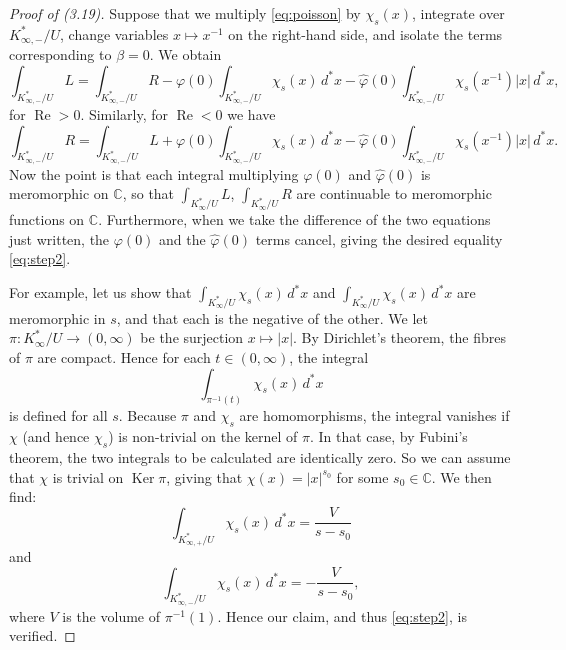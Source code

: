 \documentclass[12pt,a4paper]{article}
\theoremstyle{plain}
\theoremstyle{definition}
\DeclareMathOperator{\Res}{Re}
\DeclareMathOperator{\Ker}{Ker}
\newcommand{\C}{\mathbb{C}}
\begin{document}
\begin{proof}[Proof of (3.19)]
Suppose that we multiply \eqref{eq:poisson} by $\chi_s(x)$, integrate over $K_{\infty,-}^*/U$, change variables $x\mapsto x^{-1}$ on the right-hand side, and isolate the terms corresponding to $\beta=0$. We obtain
\[
\int_{K_{\infty,-}^*/U}L=\int_{K_{\infty,-}^*/U}R-\varphi(0)\int_{K_{\infty,-}^*/U}\chi_s(x)\,d^*x-\hat{\varphi}(0)\int_{K_{\infty,-}^*/U}\chi_s(x^{-1})|x|\,d^*x,
\]
for $\Res>0$. Similarly, for $\Res<0$ we have
\[
\int_{K_{\infty,-}^*/U}R=\int_{K_{\infty,-}^*/U}L+\varphi(0)\int_{K_{\infty,-}^*/U}\chi_s(x)\,d^*x-\hat{\varphi}(0)\int_{K_{\infty,-}^*/U}\chi_s(x^{-1})|x|\,d^*x.
\]
Now the point is that each integral multiplying $\varphi(0)$ and $\hat{\varphi}(0)$ is meromorphic on $\C$, so that $\int_{K_{\infty}^*/U}L$, $\int_{K_{\infty}^*/U}R$ are continuable to meromorphic functions on $\C$. Furthermore, when we take the difference of the two equations just written, the $\varphi(0)$ and the $\hat{\varphi}(0)$ terms cancel, giving the desired equality \eqref{eq:step2}.

For example, let us show that $\int_{K_{\infty}^*/U}\chi_s(x)\,d^*x$ and $\int_{K_{\infty}^*/U}\chi_s(x)\,d^*x$ are meromorphic in $s$, and that each is the negative of the other. We let $\pi:K_{\infty}^*/U\to(0,\infty)$ be the surjection $x\mapsto|x|$. By Dirichlet's theorem, the fibres of $\pi$ are compact. Hence for each $t\in(0,\infty)$, the integral
\[
\int_{\pi^{-1}(t)}\chi_s(x)\,d^*x
\]
is defined for all $s$. Because $\pi$ and $\chi_s$ are homomorphisms, the integral vanishes if $\chi$ (and hence $\chi_s$) is non-trivial on the kernel of $\pi$. In that case, by Fubini's theorem, the two integrals to be calculated are identically zero. So we can assume that $\chi$ is trivial on $\Ker\pi$, giving that $\chi(x)=|x|^{s_0}$ for some $s_0\in\C$. We then find:
\[
\int_{K_{\infty,+}^*/U}\chi_s(x)\,d^*x=\frac{V}{s-s_0}
\]
and
\[
\int_{K_{\infty,-}^*/U}\chi_s(x)\,d^*x=-\frac{V}{s-s_0},
\]
where $V$ is the volume of $\pi^{-1}(1)$. Hence our claim, and thus \eqref{eq:step2}, is verified.


\end{proof}
\end{document}
